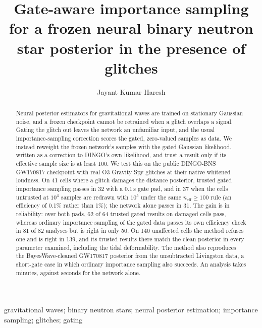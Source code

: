 \documentclass{openjournal}
\newenvironment{keywords}{\setbox0\vbox\bgroup}{\egroup}
\newcommand{\DINGOBNS}{DINGO-BNS\xspace}
\newcommand{\neff}{n_{\mathrm{eff}}}
\begin{document}
\title{Gate-aware importance sampling for a frozen neural binary neutron star posterior in the presence of glitches}

\author{Jayant Kumar Haresh}

\begin{abstract}
Neural posterior estimators for gravitational waves are trained on stationary Gaussian noise, and a frozen checkpoint cannot be retrained when a glitch overlaps a signal.
Gating the glitch out leaves the network an unfamiliar input, and the usual importance-sampling correction scores the gated, zero-valued samples as data.
We instead reweight the frozen network's samples with the gated Gaussian likelihood, written as a correction to DINGO's own likelihood, and trust a result only if its effective sample size is at least 100.
We test this on the public \DINGOBNS GW170817 checkpoint with real O3 Gravity Spy glitches at their native whitened loudness.
On 41 cells where a glitch damages the distance posterior, trusted gated importance sampling passes in 32 with a $0.1\,\mathrm{s}$ gate pad, and in 37 when the cells untrusted at $10^{4}$ samples are redrawn with $10^{5}$ under the same $\neff\ge100$ rule (an efficiency of 0.1\% rather than 1\%); the network alone passes in 31.
The gain is in reliability: over both pads, 62 of 64 trusted gated results on damaged cells pass, whereas ordinary importance sampling of the gated data passes its own efficiency check in 81 of 82 analyses but is right in only 50.
On 140 unaffected cells the method refuses one and is right in 139, and its trusted results there match the clean posterior in every parameter examined, including the tidal deformability.
The method also reproduces the BayesWave-cleaned GW170817 posterior from the unsubtracted Livingston data, a short-gate case in which ordinary importance sampling also succeeds.
An analysis takes minutes, against seconds for the network alone.
\end{abstract}

\begin{keywords}
{gravitational waves; binary neutron stars; neural posterior estimation; importance sampling; glitches; gating}
\end{keywords}

\maketitle
\end{document}
